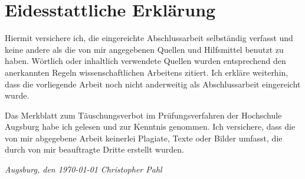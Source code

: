 \newpage
\section*{Eidesstattliche Erklärung}
\thispagestyle{empty}

\vspace{1cm}

Hiermit versichere ich, die eingereichte Abschlussarbeit selbständig verfasst
und keine andere als die von mir angegebenen Quellen und Hilfsmittel benutzt zu
haben. Wörtlich oder inhaltlich verwendete Quellen wurden entsprechend den
anerkannten Regeln wissenschaftlichen Arbeitens zitiert. Ich erkläre weiterhin,
dass die vorliegende Arbeit noch nicht anderweitig als Abschlussarbeit
eingereicht wurde. 

Das Merkblatt zum Täuschungsverbot im Prüfungsverfahren der Hochschule Augsburg
habe ich gelesen und zur Kenntnis genommen. Ich versichere, dass die von mir
abgegebene Arbeit keinerlei Plagiate, Texte oder Bilder umfasst, die durch von
mir beauftragte Dritte erstellt wurden.

\vspace{3cm}
\hfill\underline{\hspace{4cm}}

\vspace{0.2cm}
\textit{Augsburg, den \today} \hfill \textit{Christopher Pahl}
